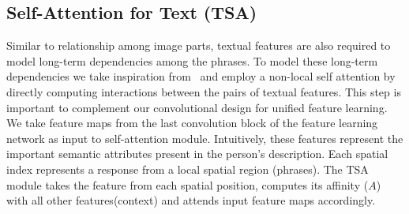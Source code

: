 \documentclass[letterpaper]{article} \usepackage{aaai22}  \usepackage{times}  \usepackage{helvet}  \usepackage{courier}  \usepackage[hyphens]{url}  \usepackage{graphicx} \urlstyle{rm} \def\UrlFont{\rm}  \usepackage{natbib}  \usepackage{caption} \DeclareCaptionStyle{ruled}{labelfont=normalfont,labelsep=colon,strut=off} \frenchspacing  \setlength{\pdfpagewidth}{8.5in}  \setlength{\pdfpageheight}{11in}  \usepackage{algorithm}
\begin{document}
\subsection{Self-Attention for Text (TSA)}
Similar to relationship among image parts, textual features are also required to model long-term dependencies among the phrases. To model these long-term dependencies we take inspiration from~\cite{wang2018non,cao2019gcnet} and employ a non-local self attention by directly computing interactions between the pairs of textual features. This step is important to complement our convolutional design for unified feature learning. We take feature maps from the last convolution block of the feature learning network as input to self-attention module. Intuitively, these features represent the important semantic attributes present in the person's description. Each spatial index represents a response from a local spatial region (phrases). The TSA module takes the feature from each spatial position, computes its affinity ($A$) with all other features(context) and attends input feature maps accordingly.
\begin{comment}
\setlength{\abovedisplayskip}{0pt} \setlength{\abovedisplayshortskip}{0pt}
\begin{equation}
    A = Softmax(W_{k}\mathbf{t})
\end{equation}
\begin{equation}
    t_{i}' = ti + W_{2}\;(ReLU(W_{1}\sum_{j=1}^{14}A\:tj))
\end{equation}
\end{comment}
\end{document}
